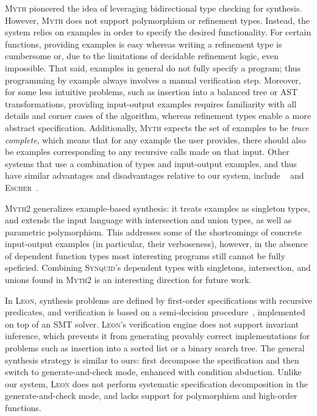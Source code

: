 \documentclass[10pt,preprint]{sigplanconf-pldi16}
\theoremstyle{definition}
\newcommand{\lang}{\textsc{Synquid}\xspace}
\begin{document}
\textsc{Myth} pioneered the idea of leveraging bidirectional type checking for synthesis. 
However, \textsc{Myth} does not support polymorphism or refinement types. 
Instead, the system relies on examples in order to specify the desired functionality. 
For certain functions, providing examples is easy
whereas writing a refinement type is cumbersome or, due to the limitations of decidable refinement logic, even impossible.
That said, examples in general do not fully specify a program;
thus programming by example always involves a manual verification step. 
Moreover, for some less intuitive problems, such as insertion into a balanced tree or AST transformations,
providing input-output examples requires familiarity with all details and corner cases of the algorithm,
whereas refinement types enable a more abstract specification.
Additionally, \textsc{Myth} expects the set of examples to be \emph{trace complete}, 
which means that for any example the user provides, there should also be examples corresponding to any recursive calls made on that input. 
Other systems that use a combination of types and input-output examples,
and thus have similar advantages and disadvantages relative to our system,
include ~\cite{FeserChDi15} and \textsc{Escher}~\cite{AlbarghouthiGuKi13}.

\textsc{Myth2} generalizes example-based synthesis: 
it treats examples as singleton types, and extends the input language with intersection and union types, as well as parametric polymorphism.
This addresses some of the shortcomings of concrete input-output examples (in particular, their verboseness),
however, in the absence of dependent function types most interesting programs still cannot be fully speficied.
Combining \lang's dependent types with singletons, intersection, and unions found in \textsc{Myth2}
is an interesting direction for future work.

In \textsc{Leon}, synthesis problems are defined by first-order specifications with recursive predicates,
and verification is based on a semi-decision procedure~\cite{SuterKoKu11}, implemented on top of an SMT solver.
\textsc{Leon}'s verification engine does not support invariant inference,
which prevents it from generating provably correct implementations for problems such as insertion into a sorted list or a binary search tree.
The general synthesis strategy is similar to ours:
first decompose the specification 
and then switch to generate-and-check mode, enhanced with condition abduction. 
Unlike our system, \textsc{Leon} does not perform systematic specification decomposition in the generate-and-check mode,
and lacks support for polymorphism and high-order functions.
\end{document}
